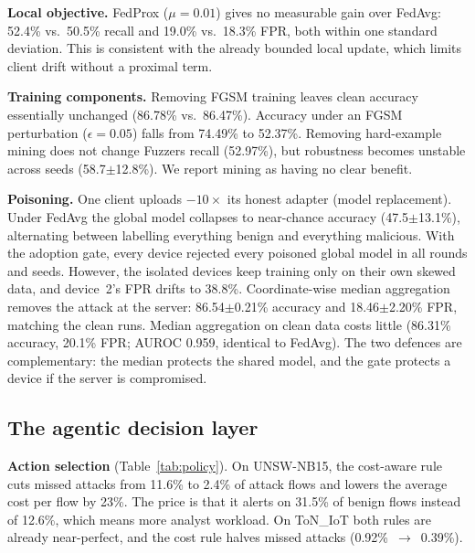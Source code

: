 \documentclass[conference]{IEEEtran}
\begin{document}
\textbf{Local objective.} FedProx ($\mu{=}0.01$) gives no measurable gain over
FedAvg: 52.4\% vs.\ 50.5\% recall and 19.0\% vs.\ 18.3\% FPR, both within
one standard deviation. This is consistent with the already bounded local
update, which limits client drift without a proximal term.

\textbf{Training components.} Removing FGSM training leaves clean accuracy
essentially unchanged (86.78\% vs.\ 86.47\%). Accuracy under an FGSM
perturbation ($\epsilon{=}0.05$) falls from 74.49\% to 52.37\%. Removing
hard-example mining does not change Fuzzers recall (52.97\%), but robustness
becomes unstable across seeds (58.7$\pm$12.8\%). We report mining as having
no clear benefit.

\textbf{Poisoning.} One client uploads $-10\times$ its honest adapter
(model replacement). Under FedAvg the global model collapses to near-chance
accuracy (47.5$\pm$13.1\%), alternating between labelling everything benign
and everything malicious. With the adoption gate, every device rejected every
poisoned global model in all rounds and seeds. However, the isolated devices
keep training only on their own skewed data, and device~2's FPR drifts to
38.8\%. Coordinate-wise median aggregation removes the attack at the server:
86.54$\pm$0.21\% accuracy and 18.46$\pm$2.20\% FPR, matching the clean runs.
Median aggregation on clean data costs little (86.31\% accuracy, 20.1\% FPR;
AUROC 0.959, identical to FedAvg). The two defences are complementary: the
median protects the shared model, and the gate protects a device if the
server is compromised.

\subsection{The agentic decision layer}
\textbf{Action selection} (Table~\ref{tab:policy}).
On UNSW-NB15, the cost-aware rule cuts missed attacks from 11.6\% to 2.4\% of
attack flows and lowers the average cost per flow by 23\%. The price is that
it alerts on 31.5\% of benign flows instead of 12.6\%, which means more
analyst workload. On ToN\_IoT both rules are already near-perfect, and the
cost rule halves missed attacks (0.92\%~$\rightarrow$~0.39\%).

\begin{table}[t]\centering
\caption{Per-flow decisions of the frozen model under the default cost table (deterministic; sd $=0$).}
\label{tab:policy}
\end{table}
\end{document}
